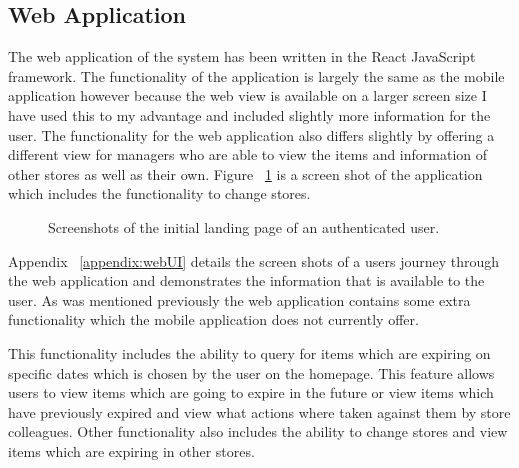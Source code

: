 \documentclass[a4paper,11pt]{report}
\begin{document}
\subsection{Web Application}
The web application of the system has been written in the React JavaScript framework. The functionality of the application is largely the same as the mobile application however because the web view is available on a larger screen size I have used this to my advantage and included slightly more information for the user. 
The functionality for the web application also differs slightly by offering a different view for managers who are able to view the items and information of other stores as well as their own. 
Figure ~\ref{fig:WebUi} is a screen shot of the application which includes the functionality to change stores.

\begin{figure}[H]
    \centering
    \caption{Screenshots of the initial landing page of an authenticated user.}
    \label{fig:WebUi}
\end{figure}

Appendix ~\ref{appendix:webUI} details the screen shots of a users journey through the web application and demonstrates the information that is available to the user.
As was mentioned previously the web application contains some extra functionality which the mobile application does not currently offer.

This functionality includes the ability to query for items which are expiring on specific dates which is chosen by the user on the homepage. This feature allows users to view items which are going to expire in the future or view items which have previously expired and view what actions where taken against them by store colleagues.
Other functionality also includes the ability to change stores and view items which are expiring in other stores. 
\end{document}

